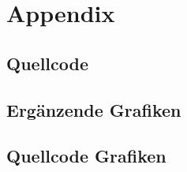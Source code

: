 
\appendix
\chapter{Appendix}
\section{Quellcode}
\section{Ergänzende Grafiken}
\section{Quellcode Grafiken}
